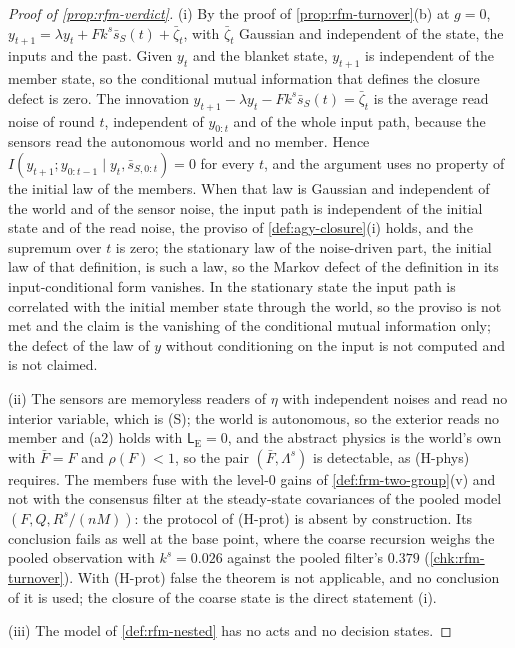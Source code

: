 \begin{proof}[Proof of \cref{prop:rfm-verdict}]
(i) By the proof of \cref{prop:rfm-turnover}(b) at $g=0$, $y_{t+1}=\lambda y_t+Fk^s\bar s_S(t)+\bar\zeta_t$, with $\bar\zeta_t$ Gaussian and independent of the state, the inputs and the past. Given $y_t$ and the blanket state, $y_{t+1}$ is independent of the member state, so the conditional mutual information that defines the closure defect is zero. The innovation $y_{t+1}-\lambda y_t-Fk^s\bar s_S(t)=\bar\zeta_t$ is the average read noise of round $t$, independent of $y_{0:t}$ and of the whole input path, because the sensors read the autonomous world and no member. Hence $I(y_{t+1};y_{0:t-1}\mid y_t,\bar s_{S,0:t})=0$ for every $t$, and the argument uses no property of the initial law of the members. When that law is Gaussian and independent of the world and of the sensor noise, the input path is independent of the initial state and of the read noise, the proviso of \cref{def:agy-closure}(i) holds, and the supremum over $t$ is zero; the stationary law of the noise-driven part, the initial law of that definition, is such a law, so the Markov defect of the definition in its input-conditional form vanishes. In the stationary state the input path is correlated with the initial member state through the world, so the proviso is not met and the claim is the vanishing of the conditional mutual information only; the defect of the law of $y$ without conditioning on the input is not computed and is not claimed.

(ii) The sensors are memoryless readers of $\eta$ with independent noises and read no interior variable, which is (S); the world is autonomous, so the exterior reads no member and (a2) holds with $\mathsf L_{\mathrm E}=0$, and the abstract physics is the world's own with $\bar F=F$ and $\rho(F)<1$, so the pair $(\bar F,\Lambda^s)$ is detectable, as (H-phys) requires. The members fuse with the level-0 gains of \cref{def:frm-two-group}(v) and not with the consensus filter at the steady-state covariances of the pooled model $(F,Q,R^s/(nM))$: the protocol of (H-prot) is absent by construction. Its conclusion fails as well at the base point, where the coarse recursion weighs the pooled observation with $k^s=0.026$ against the pooled filter's $0.379$ (\cref{chk:rfm-turnover}). With (H-prot) false the theorem is not applicable, and no conclusion of it is used; the closure of the coarse state is the direct statement (i).

(iii) The model of \cref{def:rfm-nested} has no acts and no decision states.


\end{proof}
